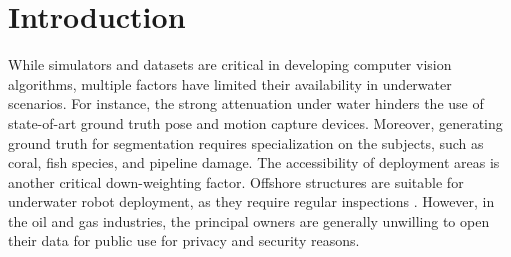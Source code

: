 \section{Introduction}
\label{mimir:sec:intro}

While simulators and datasets are critical in developing computer vision algorithms, multiple factors have limited their availability in underwater scenarios. For instance, the strong attenuation under water hinders the use of state-of-art ground truth pose and motion capture devices. Moreover, generating ground truth for segmentation requires specialization on the subjects, such as coral,  fish species, and pipeline damage. The accessibility of deployment areas is another critical down-weighting factor. Offshore structures are suitable for underwater robot deployment, as they require regular inspections \cite{rw:pipeinspection2012oil}. However, in the oil and gas industries, the principal owners are generally unwilling to open their data for public use for privacy and security reasons.


